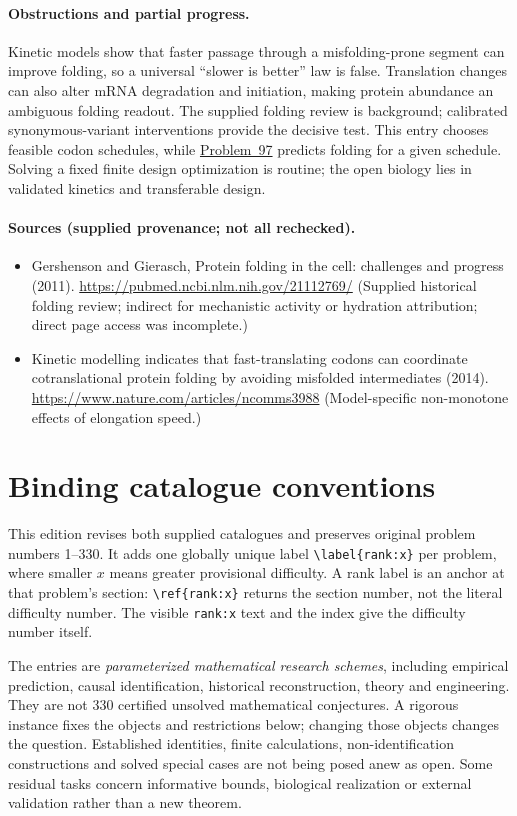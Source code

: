 \documentclass[11pt]{article}
\begin{document}
\paragraph{Obstructions and partial progress.} Kinetic models show that faster passage through a misfolding-prone segment can improve folding, so a universal ``slower is better'' law is false. Translation changes can also alter mRNA degradation and initiation, making protein abundance an ambiguous folding readout. The supplied folding review is background; calibrated synonymous-variant interventions provide the decisive test. This entry chooses feasible codon schedules, while \href{https://we-solve.github.io/problems/co-translational-folding-law-2a6d0cab/}{Problem~97} predicts folding for a given schedule. Solving a fixed finite design optimization is routine; the open biology lies in validated kinetics and transferable design.
\paragraph{Sources (supplied provenance; not all rechecked).}
\begin{itemize}
\item Gershenson and Gierasch, Protein folding in the cell: challenges and progress (2011). \url{https://pubmed.ncbi.nlm.nih.gov/21112769/} (Supplied historical folding review; indirect for mechanistic activity or hydration attribution; direct page access was incomplete.)
\item Kinetic modelling indicates that fast-translating codons can coordinate cotranslational protein folding by avoiding misfolded intermediates (2014). \url{https://www.nature.com/articles/ncomms3988} (Model-specific non-monotone effects of elongation speed.)
\end{itemize}


\section*{Binding catalogue conventions}
This edition revises both supplied catalogues and preserves original problem numbers 1--330. It adds one globally unique label \verb|\label{rank:x}| per problem, where smaller $x$ means greater provisional difficulty. A rank label is an anchor at that problem's section: \verb|\ref{rank:x}| returns the section number, not the literal difficulty number. The visible \texttt{rank:x} text and the index give the difficulty number itself.

The entries are \emph{parameterized mathematical research schemes}, including empirical prediction, causal identification, historical reconstruction, theory and engineering. They are not 330 certified unsolved mathematical conjectures. A rigorous instance fixes the objects and restrictions below; changing those objects changes the question. Established identities, finite calculations, non-identification constructions and solved special cases are not being posed anew as open. Some residual tasks concern informative bounds, biological realization or external validation rather than a new theorem.
\end{document}
